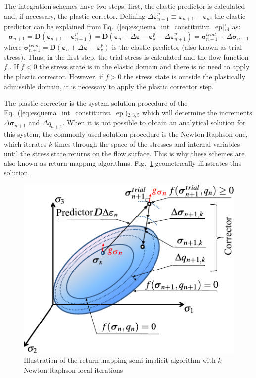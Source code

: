 \documentclass[Journal,letterpaper]{ascelike-new}
\newcommand{\Dsdee}{\boldsymbol{D}}
\newcommand{\strainp}{\boldsymbol{\varepsilon}^{p}}
\newcommand{\strain}{\boldsymbol{\varepsilon}}
\newcommand{\stress}{\boldsymbol{\sigma}}
\begin{document}
The integration schemes have two steps: first, the elastic predictor is calculated and, if necessary, the plastic corretor. Defining  $\Delta \strainp_{n+1} \equiv \strain_{n+1} - \strain_{n}$, the elastic predictor can be explained from Eq.~(\ref{eq:esquema_int_constitutiva_ep})$_4$ as: 
\begin{equation}
	\label{eq:preditor_elastico}
	\stress_{n+1} = \Dsdee(\strain_{n+1}-\strain_{n+1}^p) = \Dsdee(\strain_n+\Delta \strain-\strain_{n}^ p-\Delta \strain_{n+1}^p) = \stress_{n+1}^{trial} + \Delta \stress_{n+1}
\end{equation}
where $\stress_{n+1}^{trial} = \Dsdee (\strain_n+\Delta \strain-\strain_{n}^ p)$ is the elastic predictor (also known as trial stress). Thus, in the first step, the trial stress is calculated and the flow function $f$  . If  $f<0$  the stress state is in the elastic domain and there is no need to apply the plastic corrector. However, if $f>0$ the stress state is outside the plastically admissible domain, it is necessary to apply the plastic corrector step.

The plastic corrector is the system solution procedure of the Eq.~(\ref{eq:esquema_int_constitutiva_ep})$_{2,3,5}$ which will determine the increments $\Delta \stress_{n+1}$ and $\Delta q_{n+1}$. When it is not possible to obtain an analytical solution for this system, the commonly used solution procedure is the Newton-Raphson one, which iterates $k$ times through the space of the stresses and internal variables until the stress state returns on the flow surface. This is why these schemes are also known as return mapping algorithms. Fig.~\ref{ep-algorithm-representation} geometrically illustrates this solution.

\begin{figure}
	\centering
	\includegraphics[scale=1]{ep-algorithm-representation.pdf}
	\caption{Illustration of the return mapping semi-implicit algorithm with $k$ Newton-Raphson local iterations}
	\label{ep-algorithm-representation}
\end{figure}
\end{document}
